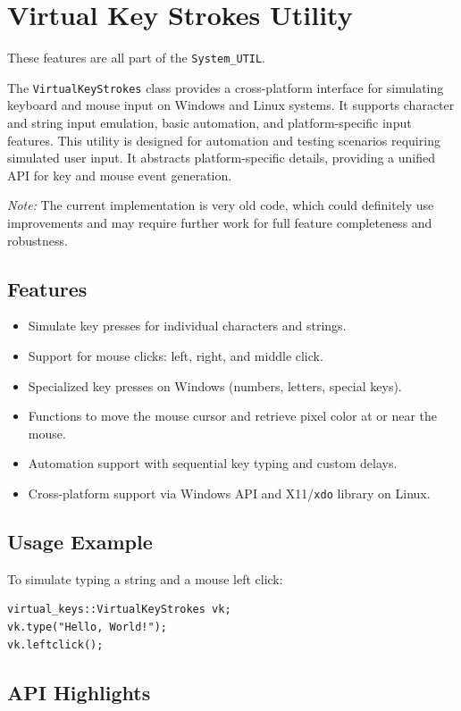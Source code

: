 \section{Virtual Key Strokes Utility}\label{sec:virtualkeystrokes}

These features are all part of the \texttt{System\_UTIL}.


The \texttt{VirtualKeyStrokes} class provides a cross-platform interface for simulating keyboard and mouse input on Windows and Linux systems. It supports character and string input emulation, basic automation, and platform-specific input features. This utility is designed for automation and testing scenarios requiring simulated user input. It abstracts platform-specific details, providing a unified API for key and mouse event generation.

\textit{Note:} The current implementation is very old code, which could definitely use improvements and may require further work for full feature completeness and robustness.

\subsection{Features}
\begin{itemize}\itemsep0em
	\item Simulate key presses for individual characters and strings.
	\item Support for mouse clicks: left, right, and middle click.
	\item Specialized key presses on Windows (numbers, letters, special keys).
	\item Functions to move the mouse cursor and retrieve pixel color at or near the mouse.
	\item Automation support with sequential key typing and custom delays.
	\item Cross-platform support via Windows API and X11/\texttt{xdo} library on Linux.
\end{itemize}

\subsection{Usage Example}
To simulate typing a string and a mouse left click:
\begin{lstlisting}[style=cppstyle]
virtual_keys::VirtualKeyStrokes vk;
vk.type("Hello, World!");
vk.leftclick();
\end{lstlisting}

\subsection{API Highlights}

